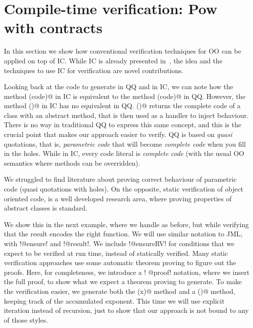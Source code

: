 \section{Compile-time verification: Pow with contracts}
\label{s:verification}
In this section we show how conventional verification techniques for OO can be applied on top of IC.
While IC is already presented in~\cite{servetto2014meta},
the idea and the techniques to use IC for verification are novel contributions.

Looking back at the code to generate \Q@pow@ in QQ and in IC,
we can
note how the method \Q@inductive(code)@ in IC is equivalent to the method
\Q@inductive(code)@ in QQ.
However,
the method \Q@inductive()@ in IC has no equivalent in QQ.
\Q@inductive()@ returns the complete code of a class with an abstract method,
that is then used as a handler to inject behaviour.
There is no way in traditional QQ to express this same concept,
and this is the crucial point that makes our approach easier to verify.
QQ is based on \emph{quasi} quotations, that is, \emph{parametric code} that
will become \emph{complete code} when you fill in the holes.
While in IC, every code literal is \emph{complete code} (with
the usual OO semantics where methods can be overridden).

We struggled to find literature about proving correct behaviour of parametric code (quasi quotations with holes). On the opposite, static verification of object oriented code,
is a well developed research area, where proving properties
of abstract classes is standard.

We show this in the next example, where we handle \Q@pow@ as before, but while verifying that the
result encodes the right \Q@pow@ function. We will use similar notation to JML, with \Q!@ensure! and \Q!@result!.
We include \Q!@ensureRV! for conditions that we expect to be verified at run time, instead of statically verified.
Many static verification approaches use some automatic theorem proving to figure out the proofs. Here, for completeness, we introduce a 
\Q! @proof! notation, where we insert the full proof, to show what we expect a theorem proving to generate.
To make the verification easier, we generate both the \Q@pow(x)@ method
and a \Q@exp()@ method, keeping track of the accumulated exponent.
This time we will use explicit iteration instead of recursion, just to show that our approach is not bound to any of those styles.
\newcommand\thisExp{\ensuremath{{}^{\textbf{this.exp()}}}}
\newcommand\thisSuperExp{\ensuremath{{}^{\textbf{this.superExp()}}}}
\newcommand\oneThisSuperExp{\ensuremath{{}^{\textbf{1+this.superExp()}}}}
\newcommand\powerY{\ensuremath{{}^{\textbf{y}}}}

